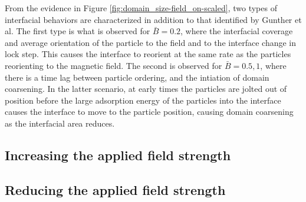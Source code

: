 From the evidence in Figure \ref{fig:domain_size-field_on-scaled}, two types of interfacial behaviors are characterized 
in addition to that identified by Gunther et al. \cite{gunther_timescales_2014} The first type is what is observed for 
$\bar{B} = 0.2$, where the interfacial coverage and average orientation of the particle to the field and to the 
interface change in lock step. This causes the interface to reorient at the same rate as the particles reorienting 
to the magnetic field. The second is observed for $\bar{B} = 0.5, 1$, where there is a time lag between particle 
ordering, and the intiation of domain coarsening. In the latter scenario, at early times the particles are jolted 
out of position before the large adsorption energy of the particles into the interface causes the interface to move 
to the particle position, causing domain coarsening as the interfacial area reduces. 

\subsection{Increasing the applied field strength}

\subsection{Reducing the applied field strength}